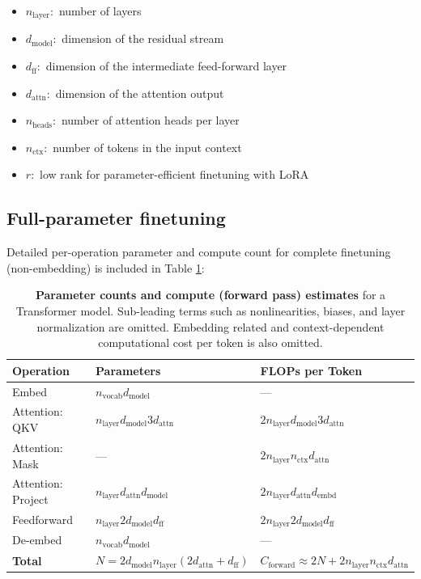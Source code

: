 \documentclass{article} %
\begin{document}
\begin{itemize}

\item $n_{\text{layer}} : $ number of layers 
\item $d_{\text{model}} : $ dimension of the residual stream 
\item $d_{\text{ff}} : $ dimension of the intermediate feed-forward layer
\item $d_{\text{attn}}: $ dimension of the attention output
\item $n_{\text{heads}} : $ number of attention heads per layer 
\item $n_{\text{ctx}} : $ number of tokens in the input context
\item $r : $ low rank for parameter-efficient finetuning with LoRA
\end{itemize}

\subsection{Full-parameter finetuning}
\label{app:full_param}

 Detailed per-operation parameter and compute count for complete finetuning (non-embedding) is included in Table \ref{tab:flops_table}:

\begin{table}[htbp]
\centering
\renewcommand{\arraystretch}{1.2}
\begin{tabular}{|l|l|l|}
\hline
\textbf{Operation} & \textbf{Parameters} & \textbf{FLOPs per Token} \\ \hline
Embed & $n_{\text{vocab}} d_{\text{model}}$ & ---  \\ \hline
Attention: QKV & $n_{\text{layer}}d_{\text{model}} 3d_{\text{attn}}$ & $2n_{\text{layer}}d_{\text{model}}3d_{\text{attn}}$ \\ \hline
Attention: Mask & --- & $2n_{\text{layer}}n_{\text{ctx}}d_{\text{attn}}$ \\ \hline
Attention: Project & $n_{\text{layer}}d_{\text{attn}}d_{\text{model}}$ & $2n_{\text{layer}}d_{\text{attn}}d_{\text{embd}}$ \\ \hline
Feedforward & $n_{\text{layer}} 2d_{\text{model}}d_{\text{ff}}$ & $2n_{\text{layer}}2d_{\text{model}}d_{\text{ff}}$ \\ \hline
De-embed & $n_{\text{vocab}} d_{\text{model}}$ & --- \\ \hline
\textbf{Total} & $N = 2d_{\text{model}}n_{\text{layer}}(2d_{\text{attn}} + d_{\text{ff}})$ & $C_{\text{forward}} \approx 2N + 2n_{\text{layer}}n_{\text{ctx}}d_{\text{attn}}$ \\ \hline
\end{tabular}
\caption{\textbf{Parameter counts and compute (forward pass) estimates} for a Transformer model. Sub-leading terms such as nonlinearities, biases, and layer normalization are omitted. Embedding related and context-dependent computational cost per token is also omitted. }
\label{tab:flops_table}
\end{table}
\end{document}
